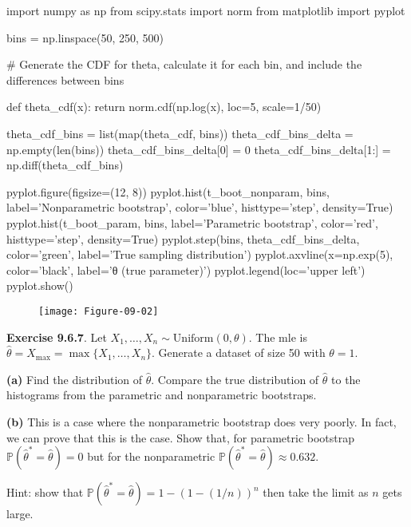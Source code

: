 \begin{python}
import numpy as np
from scipy.stats import norm
from matplotlib import pyplot

bins = np.linspace(50, 250, 500)
\end{python}

\begin{python}
# Generate the CDF for theta, calculate it for each bin, and include the differences between bins

def theta_cdf(x):
    return norm.cdf(np.log(x), loc=5, scale=1/50)

theta_cdf_bins = list(map(theta_cdf, bins))
theta_cdf_bins_delta = np.empty(len(bins))
theta_cdf_bins_delta[0] = 0
theta_cdf_bins_delta[1:] = np.diff(theta_cdf_bins)
\end{python}

\begin{python}
pyplot.figure(figsize=(12, 8))
pyplot.hist(t_boot_nonparam, bins, label='Nonparametric bootstrap', color='blue', histtype='step', density=True)
pyplot.hist(t_boot_param, bins, label='Parametric bootstrap', color='red', histtype='step', density=True)
pyplot.step(bins, theta_cdf_bins_delta, color='green', label='True sampling distribution')
pyplot.axvline(x=np.exp(5), color='black', label='θ (true parameter)')
pyplot.legend(loc='upper left')
pyplot.show()
\end{python}

\begin{figure}[H]
\texttt{[image: Figure-09-02]}
\end{figure}

\textbf{Exercise 9.6.7}. Let
\(X_1, \dots, X_n \sim \text{Uniform}(0, \theta)\). The mle is
\(\hat{\theta} = X_\text{max} = \max \{ X_1, \dots, X_n \}\). Generate a
dataset of size 50 with \(\theta = 1\).

\textbf{(a)} Find the distribution of \(\hat{\theta}\). Compare the true
distribution of \(\hat{\theta}\) to the histograms from the parametric
and nonparametric bootstraps.

\textbf{(b)} This is a case where the nonparametric bootstrap does very
poorly. In fact, we can prove that this is the case. Show that, for
parametric bootstrap \(\mathbb{P}(\hat{\theta}^* = \hat{\theta}) = 0\)
but for the nonparametric
\(\mathbb{P}(\hat{\theta}^* = \hat{\theta}) \approx 0.632\).

Hint: show that
\(\mathbb{P}(\hat{\theta}^* = \hat{\theta}) = 1 - (1 - (1/n))^n\) then
take the limit as \(n\) gets large.

